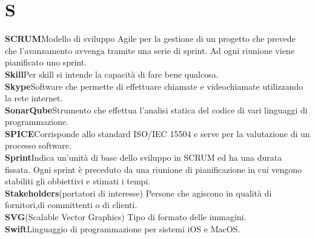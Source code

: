 \newpage
\section{S}\label{l:S}

\textbf{SCRUM}\newline Modello di sviluppo Agile per la gestione di un progetto che prevede che l'avanzamento avvenga tramite una serie di sprint. Ad ogni riunione viene pianificato uno sprint.\\
\newline
\textbf{Skill}\newline Per skill si intende la capacità di fare bene qualcosa.\\
\newline
\textbf{Skype}\newline Software che permette di effettuare chiamate e videochiamate utilizzando la rete internet.\\
\newline
\textbf{SonarQube}\newline Strumento che effettua l'analisi statica del codice di vari linguaggi di programmazione.\\
\newline
\textbf{SPICE}\newline Corrisponde allo standard ISO/IEC 15504 e serve per la valutazione di un processo software.\\
\newline
\textbf{Sprint}\newline Indica un'unità di base dello sviluppo in SCRUM ed ha una durata fissata. Ogni sprint è preceduto da una riunione di pianificazione in cui vengono stabiliti gli obbiettivi e stimati i tempi.\\
\newline
\textbf{Stakeholders}\newline (portatori di interesse) Persone che agiscono in qualità di fornitori,di committenti o di clienti.\\
\newline
\textbf{SVG}\newline (Scalable Vector Graphics) Tipo di formato delle immagini.\\
\newline
\textbf{Swift}\newline Linguaggio di programmazione per sistemi iOS e MacOS.